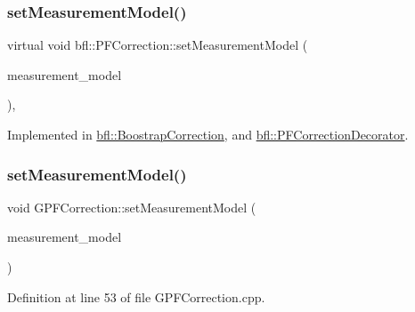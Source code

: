\subsubsection{\texorpdfstring{set\+Measurement\+Model()}{setMeasurementModel()}\hspace{0.1cm}{\footnotesize\ttfamily [1/2]}}
{\footnotesize\ttfamily virtual void bfl\+::\+P\+F\+Correction\+::set\+Measurement\+Model (\begin{DoxyParamCaption}\item[{std\+::unique\+\_\+ptr$<$ \mbox{\hyperlink{classbfl_1_1MeasurementModel}{Measurement\+Model}} $>$}]{measurement\+\_\+model }\end{DoxyParamCaption})\hspace{0.3cm}{\ttfamily [pure virtual]}, {\ttfamily [inherited]}}



Implemented in \mbox{\hyperlink{classbfl_1_1BoostrapCorrection_af6e02e5d6e6426cbee2825a77c79da43}{bfl\+::\+Boostrap\+Correction}}, and \mbox{\hyperlink{classbfl_1_1PFCorrectionDecorator_a6e96dbb6591e44d9ebaa186c6e50569b}{bfl\+::\+P\+F\+Correction\+Decorator}}.

\mbox{\label{classbfl_1_1GPFCorrection_a08ee265b0aed304403a64ef3132ba50a}} 
\subsubsection{\texorpdfstring{set\+Measurement\+Model()}{setMeasurementModel()}\hspace{0.1cm}{\footnotesize\ttfamily [2/2]}}
{\footnotesize\ttfamily void G\+P\+F\+Correction\+::set\+Measurement\+Model (\begin{DoxyParamCaption}\item[{std\+::unique\+\_\+ptr$<$ \mbox{\hyperlink{classbfl_1_1MeasurementModel}{bfl\+::\+Measurement\+Model}} $>$}]{measurement\+\_\+model }\end{DoxyParamCaption})\hspace{0.3cm}{\ttfamily [override]}}



Definition at line 53 of file G\+P\+F\+Correction.\+cpp.

\mbox{\label{classbfl_1_1PFCorrection_ab25e625ea12fe257e0eb85d465835e62}} 
